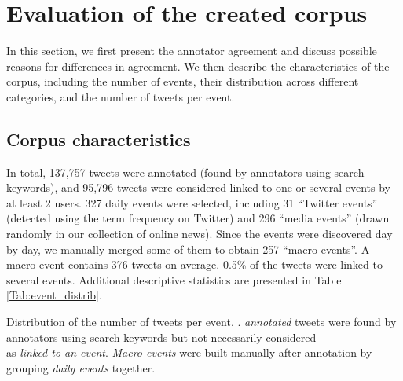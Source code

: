 \section{Evaluation of the created corpus}
\label{Evaluation of the created corpus}

In this section, we first present the annotator agreement and discuss possible reasons for differences in agreement. We then describe  the characteristics of the corpus, including the number of events, their distribution across different categories, and the number of tweets per event. 


	\subsection{Corpus characteristics}
In total, 137,757 tweets were annotated (found by
annotators using search keywords), and 95,796 tweets
were considered linked to one or several events by at least 2 users. 327
daily events were selected, including 31 “Twitter events”
(detected using the term frequency on Twitter) and 296
“media events” (drawn randomly in our collection of
online news). Since the events were discovered day by day, we
manually merged some of them to obtain 257 “macro-events”. A macro-event contains 376 tweets on average. 0.5\%
of the tweets were linked to several events. Additional
descriptive statistics are presented in Table \ref{Tab:event_distrib}.

\begin{table}
\begin{center}
\makebox[\textwidth][c]{}
\end{center}
\caption[Distribution of the number of tweets per event]{Distribution of the number of tweets per event. \label{Tab:event_distrib}. \textit{annotated} tweets were found by annotators using search
keywords but not necessarily considered \\as \textit{linked to an event}. \textit{Macro events} were built manually after annotation by grouping \textit{daily events} together.}
\end{table}



%
%


